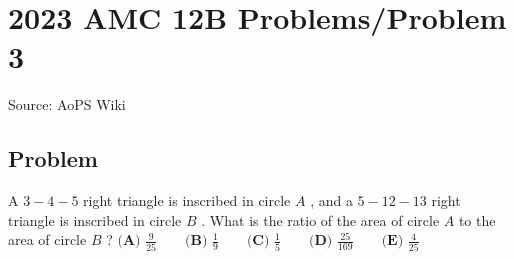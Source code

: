 \documentclass[12pt]{article}
\begin{document}
\section*{{2023 AMC 12B Problems/Problem 3}}
Source: AoPS Wiki

\subsection*{Problem}
A $3-4-5$ right triangle is inscribed in circle $A$ , and a $5-12-13$ right triangle is inscribed in circle $B$ . What is the ratio of the area of circle $A$ to the area of circle $B$ ? $\textbf{(A) }\frac{9}{25}\qquad\textbf{(B) }\frac{1}{9}\qquad\textbf{(C) }\frac{1}{5}\qquad\textbf{(D) }\frac{25}{169}\qquad\textbf{(E) }\frac{4}{25}$
\end{document}
